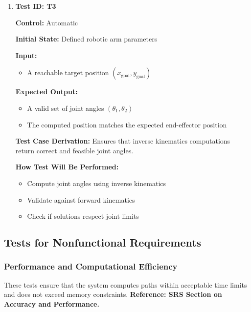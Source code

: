 \documentclass[12pt, titlepage]{article}
\begin{document}
\begin{enumerate}

\item \textbf{Test ID: T3}  

\textbf{Control:} Automatic  

\textbf{Initial State:} Defined robotic arm parameters  

\textbf{Input:}  
\begin{itemize}
    \item A reachable target position \( (x_{\text{goal}}, y_{\text{goal}}) \)  
\end{itemize}

\textbf{Expected Output:}  
\begin{itemize}
    \item A valid set of joint angles \( (\theta_1, \theta_2) \)  
    \item The computed position matches the expected end-effector position  
\end{itemize}

\textbf{Test Case Derivation:} Ensures that inverse kinematics computations return correct and feasible joint angles.  

\textbf{How Test Will Be Performed:}  
\begin{itemize}
    \item Compute joint angles using inverse kinematics  
    \item Validate against forward kinematics  
    \item Check if solutions respect joint limits  
\end{itemize}

\end{enumerate}

\subsection{Tests for Nonfunctional Requirements}

\subsubsection{Performance and Computational Efficiency}

These tests ensure that the system computes paths within acceptable time limits and does not exceed memory constraints. \textbf{Reference: SRS Section on Accuracy and Performance.}
\end{document}
